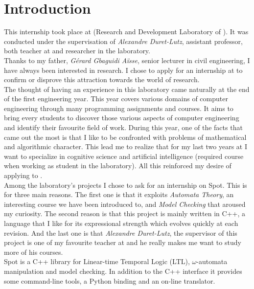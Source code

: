 \chapter{Introduction}

This internship took place at \LRDE\space (Research and Development Laboratory of \EPITA). It was conducted
under the supervisation of \textit{Alexandre Duret-Lutz}, assistant professor, both teacher at \EPITA\space
and researcher in the laboratory.\\

Thanks to my father, \textit{Gérard Gbaguidi Aïsse}, senior lecturer in civil engineering, I have always
been interested in research. I chose to apply for an internship at \LRDE\space to confirm or disprove this 
attraction towards the world of research.\\

The thought of having an experience in this laboratory came naturally at the end of the first
engineering year. This year covers various domains of computer engineering through many programming
assignments and courses. It aims to bring every students to
discover those various aspects of computer engineering and identify their favourite field of work. During
this year, one of the facts that came out the most is that I like to be confronted with problems of
mathematical and algorithmic character. This lead me to realize that for my last two years at \EPITA\space
I want to specialize in cognitive science and artificial intelligence (required course when working as
student in the laboratory). All this reinforced my desire of applying to \LRDE.\\

Among the laboratory's projects I chose to ask for an internship on Spot. This is for three
main reasons. The first one is that it exploits \textit{Automata Theory}, an interesting course we
have been introduced to, and \textit{Model Checking} that aroused my curiosity. The
second reason is that this project is mainly written in C++, a language that I like for its
expressional strength which evolves quickly at each revision. And the last one is that
\textit{Alexandre Duret-Lutz}, the supervisor of this project is one of my favourite teacher at \EPITA\space
and he really makes me want to study more of his courses.\\

Spot is a C++ library for Linear-time Temporal Logic (LTL), $\omega$-automata manipulation and model
checking. In addition to the C++ interface it provides some command-line tools, a Python binding and an
on-line translator.\\

